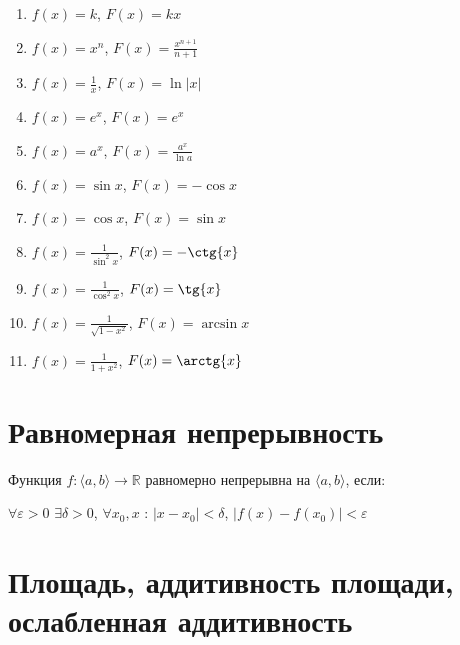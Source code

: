 \documentclass{article}
\begin{document}
			\begin{enumerate}
			
				\item $f(x) = k$, $F(x) = kx$
				
				\item $f(x) = x^n$, $F(x) = \frac{x^{n + 1}}{n + 1}$
				
				\item $f(x) = \frac{1}{x}$, $F(x) = \ln |x|$
				
				\item $f(x) = e^x$, $F(x) = e^x$
				
				\item $f(x) = a^x$, $F(x) = \frac{a^x}{\ln a}$
				
				\item $f(x) = \sin{x}$, $F(x) = -\cos{x}$
				
				\item $f(x) = \cos{x}$, $F(x) = \sin{x}$
				
				\item $f(x) = \frac{1}{\sin^2{x}}$, $F(x) = -\ctg{x}$
				
				\item $f(x) = \frac{1}{\cos^2{x}}$, $F(x) = \tg{x}$
				
				\item $f(x) = \frac{1}{\sqrt{1 - x^2}}$, $F(x) = \arcsin{x}$
				
				\item $f(x) = \frac{1}{1 + x^2}$, $F(x) = \arctg{x}$
				
			\end{enumerate}
			
		\newpage
		
		\section{Равномерная непрерывность}
		
			Функция $f : \langle a, b \rangle \rightarrow \mathbb{R}$ равномерно непрерывна на $\langle a, b \rangle$, если:
			
			$\forall \varepsilon > 0$ $\exists \delta > 0$, $\forall x_0, x$ : $|x - x_0| < \delta$, $|f(x) - f(x_0)| < \varepsilon$
			
		\newpage
		
		\section{Площадь, аддитивность площади, ослабленная аддитивность}
		
\end{document}
